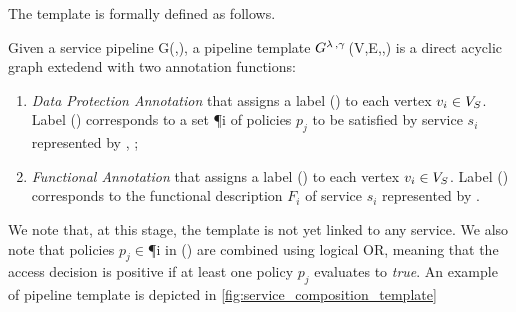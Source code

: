 The template is formally defined as follows.

\begin{definition} \label{def:template}
  Given a service pipeline G(\V,\E), a pipeline template $G^{\lambda\,,\gamma\,}$(V,E,\myLambda,\myGamma) is a direct acyclic graph extedend with two annotation functions:
  \begin{enumerate}%
    \item \emph{Data Protection Annotation} \myLambda that assigns a label \myLambda() to each vertex $v_{i}\in V_S$. Label \myLambda() corresponds to a set \P{i} of policies $p_j$ to be satisfied by service $s_i$ represented by , ;
    \item \emph{Functional Annotation} \myGamma that assigns a label \myGamma() to each vertex $v_{i}\in V_S$. Label \myGamma() corresponds to the functional description $F_i$ of service $s_i$ represented by .
  \end{enumerate}
\end{definition}

We note that, at this stage, the template is not yet linked to any service. We also note that policies $p_j$$\in$\P{i} in \myLambda() are combined using logical OR, meaning that the access decision is positive if at least one policy $p_j$ evaluates to \emph{true}.
      An example of pipeline template is depicted in \cref{fig:service_composition_template}

